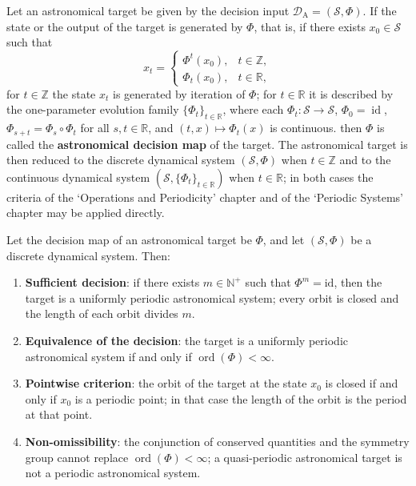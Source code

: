 \begin{definition}\label{def:astro_periodization}
Let an astronomical target be given by the decision input \(\mathcal D_{\mathrm{A}}=(\mathcal S,\Phi)\). If the state or the output of the target is generated by \(\Phi\), that is, if there exists \(x_0\in\mathcal S\) such that
\[
x_t=\begin{cases}\Phi^t(x_0), & t\in\mathbb Z,\\ \Phi_t(x_0), & t\in\mathbb R,\end{cases}
\]
for \(t\in\mathbb Z\) the state \(x_t\) is generated by iteration of \(\Phi\); for \(t\in\mathbb R\) it is described by the one-parameter evolution family \(\{\Phi_t\}_{t\in\mathbb R}\), where each \(\Phi_t:\mathcal S\to\mathcal S\), \(\Phi_0=\operatorname{id}\), \(\Phi_{s+t}=\Phi_s\circ\Phi_t\) for all \(s,t\in\mathbb R\), and \((t,x)\mapsto\Phi_t(x)\) is continuous.
then \(\Phi\) is called the \textbf{astronomical decision map} of the target. The astronomical target is then reduced to the discrete dynamical system \((\mathcal S,\Phi)\) when \(t\in\mathbb Z\) and to the continuous dynamical system \((\mathcal S,\{\Phi_t\}_{t\in\mathbb R})\) when \(t\in\mathbb R\); in both cases the criteria of the `Operations and Periodicity' chapter and of the `Periodic Systems' chapter may be applied directly.
\end{definition}

\begin{theorem}\label{thm:astro_periodicity_decision}
Let the decision map of an astronomical target be \(\Phi\), and let \((\mathcal S,\Phi)\) be a discrete dynamical system. Then:
\begin{enumerate}[label=(\Alph*)]
    \item \textbf{Sufficient decision}: if there exists \(m\in\mathbb N^+\) such that \(\Phi^m=\mathrm{id}\), then the target is a uniformly periodic astronomical system; every orbit is closed and the length of each orbit divides \(m\).
    \item \textbf{Equivalence of the decision}: the target is a uniformly periodic astronomical system if and only if \(\operatorname{ord}(\Phi)<\infty\).
    \item \textbf{Pointwise criterion}: the orbit of the target at the state \(x_0\) is closed if and only if \(x_0\) is a periodic point; in that case the length of the orbit is the period at that point.
    \item \textbf{Non-omissibility}: the conjunction of conserved quantities and the symmetry group cannot replace \(\operatorname{ord}(\Phi)<\infty\); a quasi-periodic astronomical target is not a periodic astronomical system.
\end{enumerate}
\end{theorem}

